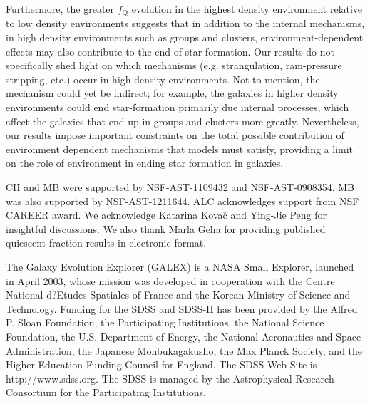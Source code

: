 \documentclass{aastex}
\begin{document}
Furthermore, the greater $f_{\mathrm{Q}}$ evolution in the highest density
environment relative to low density environments suggests that in
addition to the internal mechanisms, in high density environments such
as groups and clusters, environment-dependent effects may also
contribute to the end of star-formation. Our results do not
specifically shed light on which mechanisms (e.g. strangulation,
ram-pressure stripping, etc.) occur in high density environments. Not to 
mention, the mechanism could yet be indirect; for example, the
galaxies in higher density environments could end star-formation
primarily due internal processes, which affect the galaxies that end up
in groups and clusters more greatly.  Nevertheless, our results impose
important constraints on the total possible contribution of
environment dependent mechanisms that models must satisfy, providing a
limit on the role of environment in ending star formation in
galaxies. 

\bigskip 
CH and MB were supported by NSF-AST-1109432 and NSF-AST-0908354. MB was also supported by NSF-AST-1211644. ALC acknowledges support from NSF CAREER award. We acknowledge Katarina Kova\u{c} and Ying-Jie Peng for  insightful discussions. We also thank Marla Geha for providing published quiescent fraction results in electronic format.

The Galaxy Evolution Explorer (GALEX) is a NASA Small Explorer, launched in April 2003, whose mission was developed in cooperation with the Centre National d?Etudes Spatiales of France and the Korean Ministry of Science and Technology. Funding for the SDSS and SDSS-II has been provided by the Alfred P. Sloan Foundation, the Participating Institutions, the National Science Foundation, the U.S. Department of Energy, the National Aeronautics and Space Administration, the Japanese Monbukagakusho, the Max Planck Society, and the Higher Education Funding Council for England. The SDSS Web Site is http://www.sdss.org. The SDSS is managed by the Astrophysical Research Consortium for the Participating Institutions. 

%
%

\end{document}
